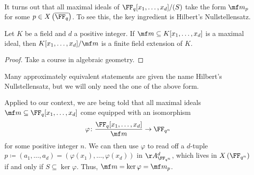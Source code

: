 \documentclass{article}
\begin{document}
It turns out that all maximal ideals of $\FF_q[x_1,\ldots,x_d]/(S)$ take the form $\mf m_p$ for some $p\in X\left(\overline{\FF_q}\right)$. To see this, the key ingredient is Hilbert's Nullstellensatz.
\begin{theorem} \label{thm:nullstellensatz}
	Let $K$ be a field and $d$ a positive integer. If $\mf m\subseteq K[x_1,\ldots,x_d]$ is a maximal ideal, then $K[x_1,\ldots,x_d]/\mf m$ is a finite field extension of $K$.
\end{theorem}
\begin{proof}
	Take a course in algebraic geometry.
\end{proof}
\begin{remark}
	Many approximately equivalent statements are given the name Hilbert's Nullstellensatz, but we will only need the one of the above form.
\end{remark}
Applied to our context, we are being told that all maximal ideals $\mf m\subseteq\FF_q[x_1,\ldots,x_d]$ come equipped with an isomorphism
\[\varphi\colon\frac{\FF_q[x_1,\ldots,x_d]}{\mf m}\to\FF_{q^n}\]
for some positive integer $n$. We can then use $\varphi$ to read off a $d$-tuple $p\coloneqq(a_1,\ldots,a_d)=(\varphi(x_1),\ldots,\varphi(x_d))$ in $\AA^d_{\FF_{q^n}}$, which lives in $X\left(\FF_{q^n}\right)$ if and only if $S\subseteq\ker\varphi$. Thus, $\mf m=\ker\varphi=\mf m_p$.
\end{document}
